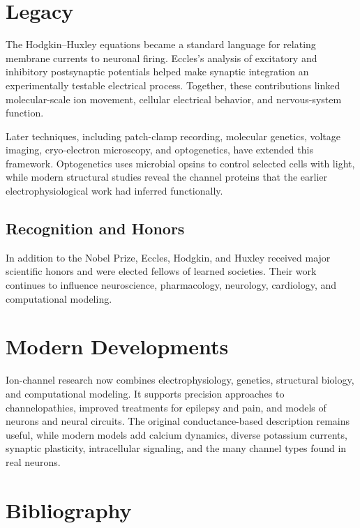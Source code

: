 \section{Legacy}

The Hodgkin--Huxley equations became a standard language for relating membrane currents to neuronal firing. Eccles's analysis of excitatory and inhibitory postsynaptic potentials helped make synaptic integration an experimentally testable electrical process. Together, these contributions linked molecular-scale ion movement, cellular electrical behavior, and nervous-system function.

Later techniques, including patch-clamp recording, molecular genetics, voltage imaging, cryo-electron microscopy, and optogenetics, have extended this framework. Optogenetics uses microbial opsins to control selected cells with light, while modern structural studies reveal the channel proteins that the earlier electrophysiological work had inferred functionally.

\subsection{Recognition and Honors}

In addition to the Nobel Prize, Eccles, Hodgkin, and Huxley received major scientific honors and were elected fellows of learned societies. Their work continues to influence neuroscience, pharmacology, neurology, cardiology, and computational modeling.

\section{Modern Developments}

Ion-channel research now combines electrophysiology, genetics, structural biology, and computational modeling. It supports precision approaches to channelopathies, improved treatments for epilepsy and pain, and models of neurons and neural circuits. The original conductance-based description remains useful, while modern models add calcium dynamics, diverse potassium currents, synaptic plasticity, intracellular signaling, and the many channel types found in real neurons.

\section{Bibliography}

